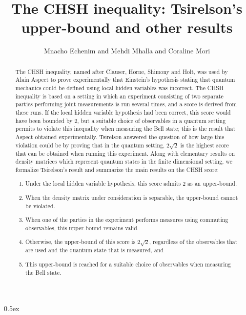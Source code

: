 \documentclass[11pt,a4paper]{article}
\begin{document}
\title{The CHSH inequality: Tsirelson's upper-bound and other results}
\author{Mnacho Echenim and Mehdi Mhalla and Coraline Mori}
\maketitle
\begin{abstract}
	The CHSH inequality, named after Clauser, Horne, Shimony and Holt, was used by Alain Aspect to prove experimentally that Einstein's hypothesis stating that quantum mechanics could be defined using local hidden variables was incorrect. 
	The CHSH inequality is based on a setting in which an experiment consisting of two separate parties performing joint measurements is run several times, and a score is derived from these runs. If the local hidden variable hypothesis had been correct, this score would have been bounded by $2$, but a suitable choice of observables in a quantum setting permits to violate this inequality when measuring the Bell state; this is the result that Aspect obtained experimentally. Tsirelson answered the question of how large this violation could be by proving that in the quantum setting, $2\sqrt{2}$ is the highest score that can be obtained when running this experiment. Along with elementary results on density matrices which represent quantum states in the finite dimensional setting, we formalize Tsirelson's result and summarize the main results on the CHSH score:
	\begin{enumerate}
		\item Under the local hidden variable hypothesis, this score admits 2 as an upper-bound.
		\item When the density matrix under consideration is separable, the upper-bound cannot be violated.
		\item When one of the parties in the experiment performs measures using commuting observables, this upper-bound remains valid.
		\item Otherwise, the upper-bound of this score is $2\sqrt{2}$, regardless of the observables that are used and the quantum state that is measured, and
		\item This upper-bound is reached for a suitable choice of observables when measuring the Bell state.		
	\end{enumerate}
\end{abstract}

\tableofcontents

\parindent 0pt\parskip 0.5ex



%
%
\end{document}
